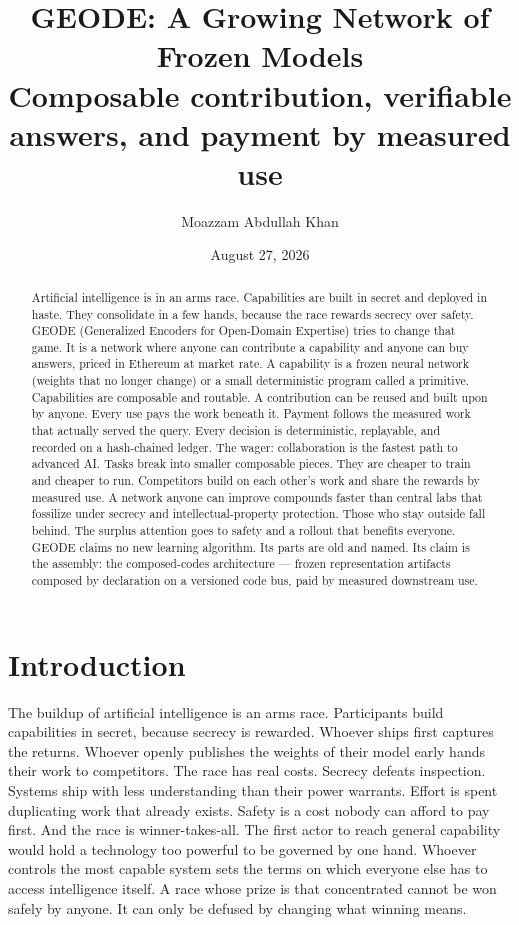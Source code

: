 \documentclass[11pt]{article}
\title{\bfseries GEODE: A Growing Network of Frozen Models\\[0.4em]
\large Composable contribution, verifiable answers, and payment by measured use}
\author{Moazzam Abdullah Khan}
\date{August 27, 2026}
\begin{document}
\maketitle

\begin{abstract}
Artificial intelligence is in an arms race. Capabilities are built
in secret and deployed in haste. They consolidate in a few hands,
because the race rewards secrecy over safety. GEODE (Generalized
Encoders for Open-Domain Expertise) tries to change that game. It
is a network where anyone can contribute a capability and anyone
can buy answers, priced in Ethereum at market rate. A capability
is a frozen neural network (weights that no longer change) or a
small deterministic program called a primitive. Capabilities are
composable and routable. A contribution can be reused and built
upon by anyone. Every use pays the work beneath it. Payment
follows the measured work that actually served the query. Every
decision is deterministic, replayable, and recorded on a
hash-chained ledger. The wager: collaboration is the fastest path
to advanced AI. Tasks break into smaller composable pieces. They
are cheaper to train and cheaper to run. Competitors build on each
other's work and share the rewards by measured use. A network
anyone can improve compounds faster than central labs that
fossilize under secrecy and intellectual-property protection.
Those who stay outside fall behind. The surplus attention goes to
safety and a rollout that benefits everyone. GEODE claims no new
learning algorithm. Its parts are old and named. Its claim is the
assembly: the composed-codes architecture --- frozen representation
artifacts composed by declaration on a versioned code bus, paid by
measured downstream use.
\end{abstract}

\tableofcontents

\section{Introduction}

The buildup of artificial intelligence is an arms race. Participants
build capabilities in secret, because secrecy is rewarded. Whoever
ships first captures the returns. Whoever openly publishes the weights 
of their model early hands their work to competitors. The race has 
real costs. Secrecy defeats inspection. Systems ship with less 
understanding than their power warrants. Effort is spent duplicating 
work that already exists. Safety is a cost nobody can afford to pay 
first. And the race is winner-takes-all. The first actor to reach 
general capability would hold a technology too powerful to be governed 
by one hand. Whoever controls the most capable system sets the terms 
on which everyone else has to access intelligence itself. A race whose 
prize is that concentrated cannot be won safely by anyone. It can only be
defused by changing what winning means.
\end{document}
